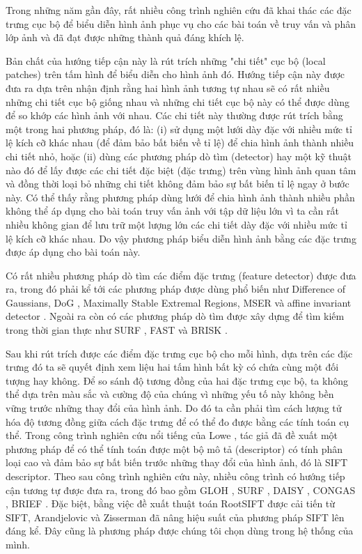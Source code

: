 Trong những năm gần đây, rất nhiều công trình nghiên cứu đã khai thác các đặc trưng cục bộ để biểu diễn hình ảnh phục vụ cho các bài toán về truy vấn và phân lớp ảnh và đã đạt được những thành quả đáng khích lệ.

Bản chất của hướng tiếp cận này là rút trích những "chi tiết" cục bộ (local patches) trên tấm hình để biểu diễn cho hình ảnh đó. Hướng tiếp cận này được đưa ra dựa trên nhận định rằng hai hình ảnh tương tự nhau sẽ có rất nhiều những chi tiết cục bộ giống nhau và những chi tiết cục bộ này có thể được dùng để so khớp các hình ảnh với nhau. Các chi tiết này thường được rút trích bằng một trong hai phương pháp, đó là: (i) sử dụng một lưới dày đặc với nhiều mức tỉ lệ kích cỡ khác nhau (để đảm bảo bất biến về tỉ lệ) để chia hình ảnh thành nhiều chi tiết nhỏ, hoặc (ii) dùng các phương pháp dò tìm (detector) hay một kỹ thuật nào đó để lấy được các chi tiết đặc biệt (đặc trưng) trên vùng hình ảnh quan tâm và đồng thời loại bỏ những chi tiết không đảm bảo sự bất biến tỉ lệ ngay ở bước này. Có thể thấy rằng phương pháp dùng lưới để chia hình ảnh thành nhiều phần không thể áp dụng cho bài toán truy vấn ảnh với tập dữ liệu lớn vì ta cần rất nhiều không gian để lưu trữ một lượng lớn các chi tiết dày đặc với nhiều mức tỉ lệ kích cỡ khác nhau. Do vậy phương pháp biểu diễn hình ảnh bằng các đặc trưng được áp dụng cho bài toán này.

Có rất nhiều phương pháp dò tìm các điểm đặc trưng (feature detector) được đưa ra, trong đó phải kể tới các phương pháp được dùng phổ biến như Difference of Gaussians, DoG \cite{lowe2004distinctive}, Maximally Stable Extremal Regions, MSER \cite{matas2004robust} và affine invariant detector \cite{mikolajczyk2004scale}. Ngoài ra còn có các phương pháp dò tìm được xây dựng để tìm kiếm trong thời gian thực như SURF \cite{bay2006surf}, FAST \cite{rosten2010faster} và BRISK \cite{leutenegger2011brisk}.

Sau khi rút trích được các điểm đặc trưng cục bộ cho mỗi hình, dựa trên các đặc trưng đó ta sẽ quyết định xem liệu hai tấm hình bất kỳ có chứa cùng một đối tượng hay không. Để so sánh độ tương đồng của hai đặc trưng cục bộ, ta không thể dựa trên màu sắc và cường độ của chúng vì những yếu tố này không bền vững trước những thay đổi của hình ảnh. Do đó ta cần phải tìm cách lượng tử hóa độ tương đồng giữa cách đặc trưng để có thể đo được bằng các tính toán cụ thể. Trong công trình nghiên cứu nổi tiếng của Lowe \cite{lowe2004distinctive}, tác giả đã đề xuất một phương pháp để có thể tính toán được một bộ mô tả (descriptor) có tính phân loại cao và đảm bảo sự bất biến trước những thay đổi của hình ảnh, đó là SIFT descriptor. Theo sau công trình nghiên cứu này, nhiều công trình có hướng tiếp cận tương tự được đưa ra, trong đó bao gồm GLOH \cite{mikolajczyk2005performance}, SURF \cite{bay2006surf}, DAISY \cite{tola2008fast}, CONGAS \cite{zheng2009tour}, BRIEF \cite{calonder2010brief}. Đặc biệt, bằng việc đề xuất thuật toán RootSIFT được cải tiến từ SIFT, Arandjelovic và Zisserman \cite{arandjelovic2012three} đã nâng hiệu suất của phương pháp SIFT lên đáng kể. Đây cũng là phương pháp được chúng tôi chọn dùng trong hệ thống của mình.

